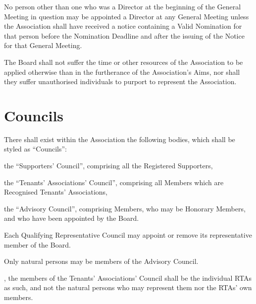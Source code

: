 \documentclass[10pt]{mk-articles-of-association}
\newcommand{\EC}[0]{Board}
\newcommand{\Exec}[0]{\EC{} }
\newcommand{\RTA}[0]{Recognised Tenants' Association}
\begin{document}
\begin{constenum}
  \item No person other than one who was a Director at the beginning
    of the General Meeting in question may be
    appointed a Director at any General Meeting unless the Association
    shall have received a notice containing a Valid Nomination for that
    person before the Nomination Deadline and after the issuing of the
    Notice for that General Meeting.

  \item The \Exec shall not suffer the time or other resources of
    the Association to be applied otherwise than in the furtherance of
    the Association's Aims, nor shall they suffer unauthorised individuals
    to purport to represent the Association.

\end{constenum}



\section{Councils}
\label{councils}
\begin{constenum}

\item There shall exist within the Association the following bodies, which
  shall be styled as ``Councils'':
  \begin{constenum}
  \item the ``Supporters' Council'', comprising all the Registered
    Supporters,
  \item the ``Tenants' Associations' Council'', comprising all Members
    which are \RTA{}s, \ITand
  \item the ``Advisory Council'', comprising Members, who may be
    Honorary Members, and who have been appointed by the
    \EC{}.\label{advcouncil}
  \end{constenum}

\item Each Qualifying Representative Council may
  appoint or remove its representative member of the \EC{}.
  \label{councilreps}

\item Only natural persons may be members of the Advisory Council.

\item \avoiddoubt, the members of the Tenants' Associations' Council
  shall be the individual RTAs as such, and not the natural persons
  who may represent them nor the RTAs' own members.

\end{constenum}
\end{document}
